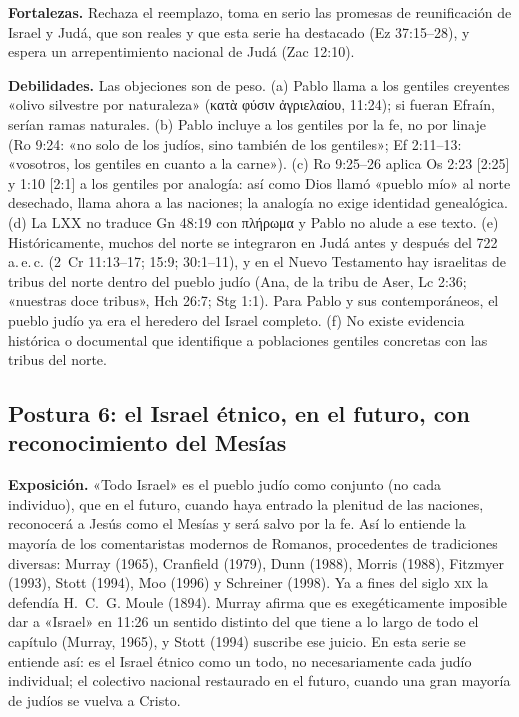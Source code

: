 \documentclass[11pt,letterpaper]{article}
\newcommand{\grc}[1]{\foreignlanguage{ancientgreek}{#1}}
\begin{document}
\textbf{Fortalezas.} Rechaza el reemplazo, toma en serio las promesas de reunificación de Israel y Judá, que son reales y que esta serie ha destacado (Ez 37:15--28), y espera un arrepentimiento nacional de Judá (Zac 12:10).

\textbf{Debilidades.} Las objeciones son de peso. (a) Pablo llama a los gentiles creyentes «olivo silvestre por naturaleza» (\grc{κατὰ φύσιν ἀγριελαίου}, 11:24); si fueran Efraín, serían ramas naturales. (b) Pablo incluye a los gentiles por la fe, no por linaje (Ro 9:24: «no solo de los judíos, sino también de los gentiles»; Ef 2:11--13: «vosotros, los gentiles en cuanto a la carne»). (c) Ro 9:25--26 aplica Os 2:23 [2:25] y 1:10 [2:1] a los gentiles por analogía: así como Dios llamó «pueblo mío» al norte desechado, llama ahora a las naciones; la analogía no exige identidad genealógica. (d) La LXX no traduce Gn 48:19 con \grc{πλήρωμα} y Pablo no alude a ese texto. (e) Históricamente, muchos del norte se integraron en Judá antes y después del 722 a.\,e.\,c. (2~Cr 11:13--17; 15:9; 30:1--11), y en el Nuevo Testamento hay israelitas de tribus del norte dentro del pueblo judío (Ana, de la tribu de Aser, Lc 2:36; «nuestras doce tribus», Hch 26:7; Stg 1:1). Para Pablo y sus contemporáneos, el pueblo judío ya era el heredero del Israel completo. (f) No existe evidencia histórica o documental que identifique a poblaciones gentiles concretas con las tribus del norte.

\subsection{Postura 6: el Israel étnico, en el futuro, con reconocimiento del Mesías}
\textbf{Exposición.} «Todo Israel» es el pueblo judío como conjunto (no cada individuo), que en el futuro, cuando haya entrado la plenitud de las naciones, reconocerá a Jesús como el Mesías y será salvo por la fe. Así lo entiende la mayoría de los comentaristas modernos de Romanos, procedentes de tradiciones diversas: Murray (1965), Cranfield (1979), Dunn (1988), Morris (1988), Fitzmyer (1993), Stott (1994), Moo (1996) y Schreiner (1998). Ya a fines del siglo \textsc{xix} la defendía H.~C.~G. Moule (1894). Murray afirma que es exegéticamente imposible dar a «Israel» en 11:26 un sentido distinto del que tiene a lo largo de todo el capítulo (Murray, 1965), y Stott (1994) suscribe ese juicio. En esta serie se entiende así: es el Israel étnico como un todo, no necesariamente cada judío individual; el colectivo nacional restaurado en el futuro, cuando una gran mayoría de judíos se vuelva a Cristo.
\end{document}
